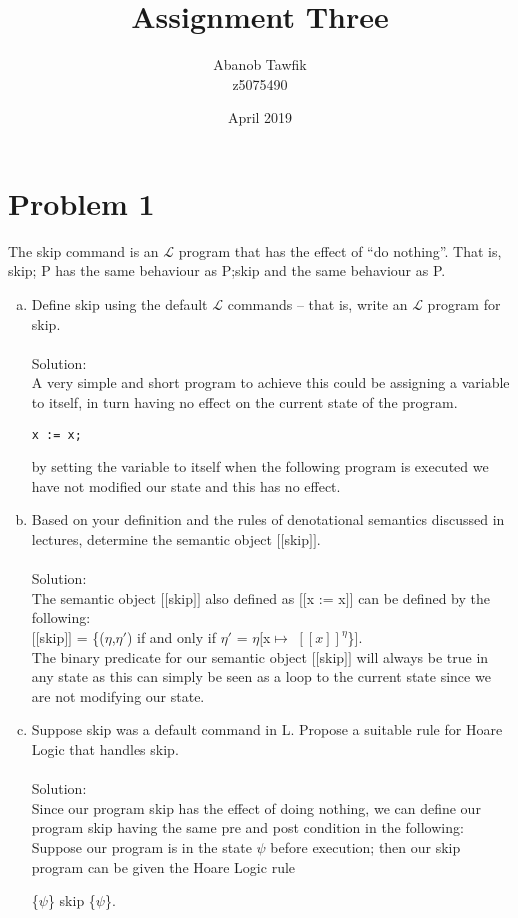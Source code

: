 \documentclass{article}
\title{Assignment Three}
\author{Abanob Tawfik\\z5075490}
\date{April 2019}
\newcommand*\moveToRight[1]{\hspace*{0em plus 1fill}\makebox{(#1)}}
\begin{document}
\maketitle
\section{Problem 1}
The skip command is an $\mathcal{L}$  program that has the effect of “do nothing”. That is, skip; P has the same behaviour as P;skip and the same behaviour as P.
\begin{enumerate}[(a)]
    \item Define skip using the default $\mathcal{L}$ commands – that is, write an $\mathcal{L}$ program for skip. \moveToRight{3 marks}\\\\
    Solution: \\
    A very simple and short program to achieve this could be assigning a variable to itself, in turn having no effect on the current state of the program.
    \begin{lstlisting}[language=Maple,mathescape=true]
x := x;
    \end{lstlisting}
    by setting the variable to itself when the following program is executed we have not modified our state and this has no effect. 
    
    \item Based on your definition and the rules of denotational semantics discussed in lectures, determine the semantic object $[\![$skip$]\!]$. \moveToRight{4 marks}\\\\
    Solution: \\
    The semantic object $[\![$skip$]\!]$ also defined as $[\![$x := x$]\!]$  can be defined by the following:\\
    $[\![$skip$]\!]$ = \{($\eta$,$\eta'$) if and only if $\eta'$ = $\eta$[x$\mapsto$ $[\![x]\!]^\eta$\}].\\
    The binary predicate for our semantic object $[\![$skip$]\!]$ will always be true in any state as this can simply be seen as a loop to the current state since we are not modifying our state.
    
    
    \item Suppose skip was a default command in L. Propose a suitable rule for Hoare Logic that handles skip. \moveToRight{3 marks}\\\\
    Solution: \\
    Since our program skip has the effect of doing nothing, we can define our program skip having the same pre and post condition in the following:\\
    Suppose our program is in the state $\psi$ before execution; then our skip program can be given the Hoare Logic rule
    \begin{center}
        \{$\psi$\} skip \{$\psi$\}.\\
    \end{center}
\end{enumerate}
\end{document}
